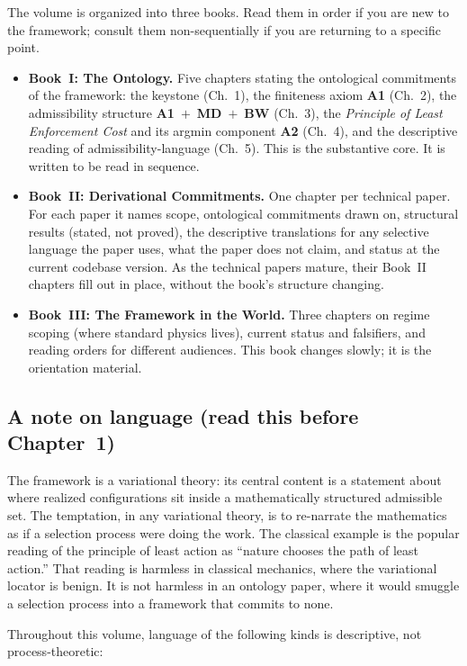 \documentclass[11pt]{article}
\begin{document}
The volume is organized into three books. Read them in order if you are new to the framework; consult them non-sequentially if you are returning to a specific point.

\begin{itemize}
    \item \textbf{Book~I: The Ontology.} Five chapters stating the ontological commitments of the framework: the keystone (Ch.~1), the finiteness axiom \textbf{A1} (Ch.~2), the admissibility structure \textbf{A1}~$+$~\textbf{MD}~$+$~\textbf{BW} (Ch.~3), the \emph{Principle of Least Enforcement Cost} and its argmin component \textbf{A2} (Ch.~4), and the descriptive reading of admissibility-language (Ch.~5). This is the substantive core. It is written to be read in sequence.
    \item \textbf{Book~II: Derivational Commitments.} One chapter per technical paper. For each paper it names scope, ontological commitments drawn on, structural results (stated, not proved), the descriptive translations for any selective language the paper uses, what the paper does not claim, and status at the current codebase version. As the technical papers mature, their Book~II chapters fill out in place, without the book's structure changing.
    \item \textbf{Book~III: The Framework in the World.} Three chapters on regime scoping (where standard physics lives), current status and falsifiers, and reading orders for different audiences. This book changes slowly; it is the orientation material.
\end{itemize}

\subsection*{A note on language (read this before Chapter~1)}

The framework is a variational theory: its central content is a statement about where realized configurations sit inside a mathematically structured admissible set. The temptation, in any variational theory, is to re-narrate the mathematics as if a selection process were doing the work. The classical example is the popular reading of the principle of least action as ``nature chooses the path of least action.'' That reading is harmless in classical mechanics, where the variational locator is benign. It is not harmless in an ontology paper, where it would smuggle a selection process into a framework that commits to none.

Throughout this volume, language of the following kinds is descriptive, not process-theoretic:
\end{document}
